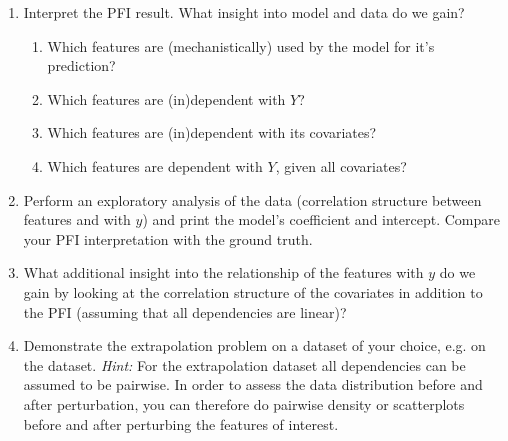 {\begin{enumerate}
    \item Interpret the PFI result. What insight into model and data do we gain?
    \begin{enumerate}
        \item Which features are (mechanistically) used by the model for it's prediction?
        \item Which features are (in)dependent with $Y$?
        \item Which features are (in)dependent with its covariates?
        \item Which features are dependent with $Y$, given all covariates?
    \end{enumerate}
    \item Perform an exploratory analysis of the data (correlation structure between features and with $y$) and print the model's coefficient and intercept. Compare your PFI interpretation with the ground truth.
    \item What additional insight into the relationship of the features with $y$ do we gain by looking at the correlation structure of the covariates in addition to the PFI (assuming that all dependencies are linear)?
    \item Demonstrate the extrapolation problem on a dataset of your choice, e.g. on the  dataset. \textit{Hint:} For the extrapolation dataset all dependencies can be assumed to be pairwise. In order to assess the data distribution before and after perturbation, you can therefore do pairwise density or scatterplots before and after perturbing the features of interest.
\end{enumerate}

}
